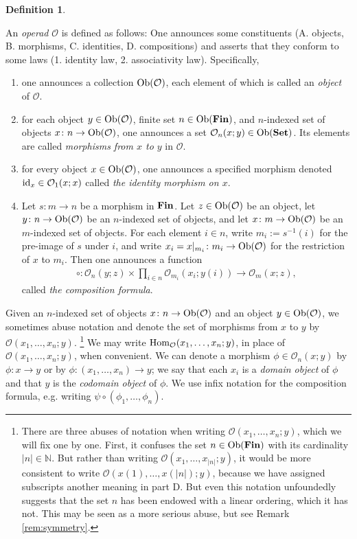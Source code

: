 \documentclass{book}
\def\tn{\textnormal}
\def\mc{\mathcal}
\def\NN{{\mathbb N}}
\def\Hom{\tn{Hom}}
\def\Ob{\tn{Ob}}
\def\hsp{\hspace{.3in}}
\def\to{\rightarrow}
\def\taking{\colon}
\def\too{\longrightarrow}
\def\m1{{-1}}
\def\id{\tn{id}}
\def\Set{{\bf Set}}
\def\mcO{\mc{O}}
\theoremstyle{remark}
\theoremstyle{definition}
\newtheorem{definition}[subsubsection]{Definition}
\def\Fin{{\bf Fin}}
\begin{document}
\begin{definition}\label{def:operad}

An {\em operad} $\mcO$ is defined as follows: One announces some constituents (A. objects, B. morphisms, C. identities, D. compositions) and asserts that they conform to some laws (1. identity law, 2. associativity law). Specifically, 
\begin{enumerate}[\hsp A.]
\item one announces a collection $\Ob(\mcO)$, each element of which is called an {\em object} of $\mcO$.
\item for each object $y\in\Ob(\mcO)$, finite set $n\in\Ob(\Fin)$, and $n$-indexed set of objects $x\taking n\to\Ob(\mcO)$, one announces a set $\mcO_n(x;y)\in\Ob(\Set)$. Its elements are called {\em morphisms from $x$ to $y$} in $\mcO$. 
\item for every object $x\in\Ob(\mcO)$, one announces a specified morphism denoted $\id_x\in\mcO_1(x;x)$ called {\em the identity morphism on $x$}.
\item Let $s\taking m\to n$ be a morphism in $\Fin$. Let $z\in\Ob(\mcO)$ be an object, let $y\taking n\to\Ob(\mcO)$ be an $n$-indexed set of objects, and let $x\taking m\to\Ob(\mcO)$ be an $m$-indexed set of objects. For each element $i\in n$, write $m_i:=s^\m1(i)$ for the pre-image of $s$ under $i$, and write $x_i=x|_{m_i}\taking m_i\to\Ob(\mcO)$ for the restriction of $x$ to $m_i$. Then one announces a function 
\begin{align}\label{dia:composition formula}
\circ\taking\mcO_n(y;z)\times\prod_{i\in n}\mcO_{m_i}(x_i;y(i))\too\mcO_{m}(x;z),
\end{align} 
called {\em the composition formula}.
\end{enumerate}
Given an $n$-indexed set of objects $x\taking n\to\Ob(\mcO)$ and an object $y\in\Ob(\mcO)$, we sometimes abuse notation and denote the set of morphisms from $x$ to $y$ by $\mcO(x_1,\ldots,x_n;y)$.
\footnote{There are three abuses of notation when writing $\mcO(x_1,\ldots,x_n;y)$, which we will fix one by one. First, it confuses the set $n\in\Ob(\Fin)$ with its cardinality $|n|\in\NN$. But rather than writing $\mcO(x_1,\ldots,x_{|n|};y)$, it would be more consistent to write $\mcO(x(1),\ldots,x(|n|);y)$, because we have assigned subscripts another meaning in part D. But even this notation unfoundedly suggests that the set $n$ has been endowed with a linear ordering, which it has not. This may be seen as a more serious abuse, but see Remark \ref{rem:symmetry}.}
We may write $\Hom_\mcO(x_1,\ldots,x_n;y)$, in place of $\mcO(x_1,\ldots,x_n;y)$, when convenient. We can denote a morphism $\phi\in\mcO_n(x;y)$ by $\phi\taking x\to y$ or by $\phi\taking (x_1,\ldots,x_n)\to y$; we say that each $x_i$ is a {\em domain object} of $\phi$ and that $y$ is the {\em codomain object} of $\phi$. We use infix notation for the composition formula, e.g. writing $\psi\circ(\phi_1,\ldots,\phi_n)$.


\end{definition}
\end{document}
